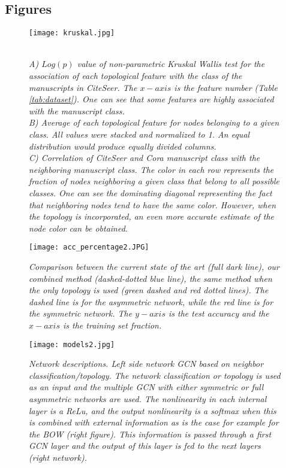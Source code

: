 \subsection*{Figures}

\begin{figure}[ht!]
    \texttt{[image: kruskal.jpg]}
    \centering
    \caption{
        \textit{
            \\A)  $Log(p)$ value of non-parametric Kruskal Wallis test for the association of each topological feature with the class of the manuscripts in CiteSeer. The $x-axis$ is the feature number (Table \ref{tab:dataset}). One can see that some features are highly associated with the manuscript class.
            \\B)  Average of each topological feature for nodes belonging to a given class. All values were stacked and normalized to 1. An equal distribution would produce equally divided columns.
            \\C)  Correlation of CiteSeer and Cora manuscript class with the neighboring manuscript class. The color in each row represents the fraction of nodes neighboring a given class that belong to all possible classes. One can see the dominating diagonal representing the fact that neighboring nodes tend to have the same color. However, when the topology is incorporated, an even more accurate estimate of the node color can be obtained.
        }
    }
    \label{fig:kruskal}
\end{figure}


\begin{figure}[ht!]
    \texttt{[image: acc\_percentage2.JPG]}
    \centering
    \caption{\textit{
        Comparison between the current state of the art (full dark line), our combined method (dashed-dotted blue line), the same method when the only topology is used (green dashed and red dotted lines). The dashed line is for the asymmetric network, while the red line is for the symmetric network. The $y-axis$ is the test accuracy and the $x-axis$ is the training set fraction.
        }}
    \label{fig:acc_comp}
\end{figure}


\begin{figure}[ht!]
    \texttt{[image: models2.jpg]}
    \centering
    \caption{\textit{
        Network descriptions. Left side network GCN based on neighbor classification/topology. The network classification or topology is used as an input and the multiple GCN with either symmetric or full asymmetric networks are used. The nonlinearity in each internal layer is a ReLu, and the output nonlinearity is a softmax when this is combined with external information as is the case for example for the BOW (right figure). This information is passed through a first GCN layer and the output of this layer is fed to the next layers (right network).
        }}
    \label{fig:models}
\end{figure}


